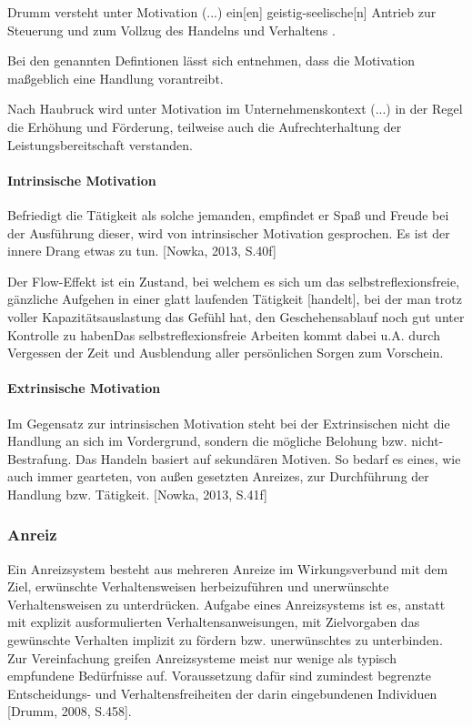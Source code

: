 Drumm versteht \glqq unter Motivation (...) ein[en] geistig-seelische[n] Antrieb zur Steuerung und zum Vollzug des Handelns und Verhaltens \grqq [Drumm, 2008, S.384].

Bei den genannten Defintionen lässt sich entnehmen, dass die Motivation maßgeblich eine Handlung vorantreibt. 

Nach Haubruck wird unter Motivation \glqq im Unternehmenskontext (...) in der Regel die Erhöhung und Förderung, teilweise auch die Aufrechterhaltung der Leistungsbereitschaft verstanden.\grqq [Haubruck, 2004, S.109]

\paragraph{Intrinsische Motivation}
Befriedigt die Tätigkeit als solche jemanden, empfindet er Spaß und Freude bei der Ausführung dieser, wird von intrinsischer Motivation gesprochen. Es ist der innere Drang etwas zu tun. [Nowka, 2013, S.40f] 

Der Flow-Effekt ist ein Zustand, bei welchem \glqq […] es sich um das selbstreflexionsfreie, gänzliche Aufgehen in einer glatt laufenden Tätigkeit [handelt], bei der man trotz voller Kapazitätsauslastung das Gefühl hat, den Geschehensablauf noch gut unter Kontrolle zu haben\grqq [Rheinberg, 2010, S.380]
Das selbstreflexionsfreie Arbeiten kommt dabei u.A. durch Vergessen der Zeit und Ausblendung aller persönlichen Sorgen zum Vorschein. 

\paragraph{Extrinsische Motivation}
Im Gegensatz zur intrinsischen Motivation steht bei der Extrinsischen nicht die Handlung an sich im Vordergrund, sondern die mögliche Belohung bzw. nicht-Bestrafung. Das Handeln basiert auf sekundären Motiven. So bedarf es eines, wie auch immer gearteten, von außen gesetzten Anreizes, zur Durchführung der Handlung bzw. Tätigkeit. [Nowka, 2013, S.41f]

\subsubsection{Anreiz}
Ein Anreizsystem besteht aus mehreren Anreize im Wirkungsverbund mit dem Ziel, erwünschte Verhaltensweisen herbeizuführen und unerwünschte Verhaltensweisen zu unterdrücken. Aufgabe eines Anreizsystems ist es, anstatt mit explizit ausformulierten Verhaltensanweisungen, mit Zielvorgaben das gewünschte Verhalten implizit zu fördern bzw. unerwünschtes zu unterbinden. Zur Vereinfachung greifen Anreizsysteme meist nur wenige als typisch empfundene Bedürfnisse auf. Voraussetzung dafür sind zumindest begrenzte Entscheidungs- und Verhaltensfreiheiten der darin eingebundenen Individuen [Drumm, 2008, S.458].

